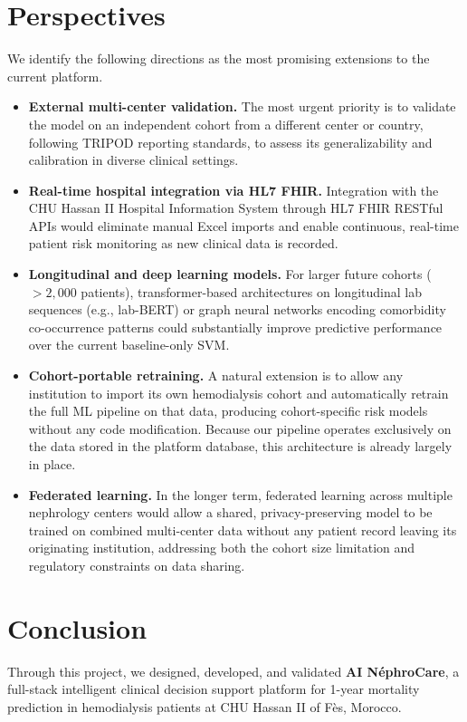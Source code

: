 \documentclass[12pt,a4paper,twoside]{report}
\begin{document}
\section*{Perspectives}

We identify the following directions as the most promising extensions to the current platform.

\begin{itemize}
  \item \textbf{External multi-center validation.} The most urgent priority is to validate the model on an independent cohort from a different center or country, following TRIPOD reporting standards, to assess its generalizability and calibration in diverse clinical settings.
  \item \textbf{Real-time hospital integration via HL7 FHIR.} Integration with the CHU Hassan II Hospital Information System through HL7 FHIR RESTful APIs would eliminate manual Excel imports and enable continuous, real-time patient risk monitoring as new clinical data is recorded.
  \item \textbf{Longitudinal and deep learning models.} For larger future cohorts ($>2{,}000$ patients), transformer-based architectures on longitudinal lab sequences (e.g., lab-BERT) or graph neural networks encoding comorbidity co-occurrence patterns could substantially improve predictive performance over the current baseline-only SVM.
  \item \textbf{Cohort-portable retraining.} A natural extension is to allow any institution to import its own hemodialysis cohort and automatically retrain the full ML pipeline on that data, producing cohort-specific risk models without any code modification. Because our pipeline operates exclusively on the data stored in the platform database, this architecture is already largely in place.
  \item \textbf{Federated learning.} In the longer term, federated learning across multiple nephrology centers would allow a shared, privacy-preserving model to be trained on combined multi-center data without any patient record leaving its originating institution, addressing both the cohort size limitation and regulatory constraints on data sharing.
\end{itemize}

\section*{Conclusion}

Through this project, we designed, developed, and validated \textbf{AI NéphroCare}, a full-stack intelligent clinical decision support platform for 1-year mortality prediction in hemodialysis patients at CHU Hassan II of Fès, Morocco.
\end{document}
